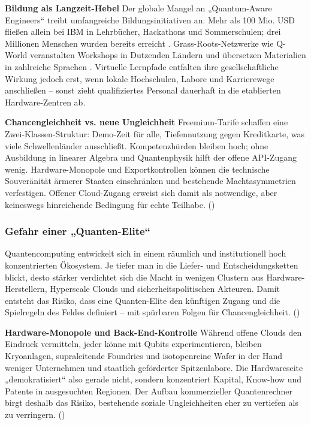 \textbf{Bildung als Langzeit-Hebel}
Der globale Mangel an „Quantum-Aware Engineers“ treibt umfangreiche Bildungsinitiativen an. Mehr als 100 Mio. USD fließen allein bei IBM in Lehrbücher, Hackathons und Sommerschulen; drei Millionen Menschen wurden bereits erreicht . Grass-Roots-Netzwerke wie Q-World veranstalten Workshops in Dutzenden Ländern und übersetzen Materialien in zahlreiche Sprachen .
Virtuelle Lernpfade entfalten ihre gesellschaftliche Wirkung jedoch erst, wenn lokale Hochschulen, Labore und Karrierewege anschließen – sonst zieht qualifiziertes Personal dauerhaft in die etablierten Hardware-Zentren ab.\cite{seskirDemocratizationQuantumTechnologies2022}

\textbf{Chancengleichheit vs. neue Ungleichheit}
Freemium-Tarife schaffen eine Zwei-Klassen-Struktur: Demo-Zeit für alle, Tiefennutzung gegen Kreditkarte, was viele Schwellenländer ausschließt.
Kompetenzhürden bleiben hoch; ohne Ausbildung in linearer Algebra und Quantenphysik hilft der offene API-Zugang wenig.
Hardware-Monopole und Exportkontrollen können die technische Souveränität ärmerer Staaten einschränken und bestehende Machtasymmetrien verfestigen.
Offener Cloud-Zugang erweist sich damit als notwendige, aber keineswegs hinreichende Bedingung für echte Teilhabe. (\cite{seskirDemocratizationQuantumTechnologies2022})

\subsubsection{Gefahr einer „Quanten-Elite“}
Quantencomputing entwickelt sich in einem räumlich und institutionell hoch konzentrierten Ökosystem. Je tiefer man in die Liefer- und Entscheidungsketten blickt, desto stärker verdichtet sich die Macht in wenigen Clustern aus Hardware-Herstellern, Hyperscale Clouds und sicherheitspolitischen Akteuren. Damit entsteht das Risiko, dass eine Quanten-Elite den künftigen Zugang und die Spielregeln des Feldes definiert – mit spürbaren Folgen für Chancengleichheit. (\cite{seskirDemocratizationQuantumTechnologies2022})

\textbf{Hardware-Monopole und Back-End-Kontrolle}
Während offene Clouds den Eindruck vermitteln, jeder könne mit Qubits experimentieren, bleiben Kryoanlagen, supraleitende Foundries und isotopenreine Wafer in der Hand weniger Unternehmen und staatlich geförderter Spitzenlabore. Die Hardwareseite „demokratisiert“ also gerade nicht, sondern konzentriert Kapital, Know-how und Patente in ausgesuchten Regionen. Der Aufbau kommerzieller Quantenrechner birgt deshalb das Risiko, bestehende soziale Ungleichheiten eher zu vertiefen als zu verringern. (\cite{seskirDemocratizationQuantumTechnologies2022})


